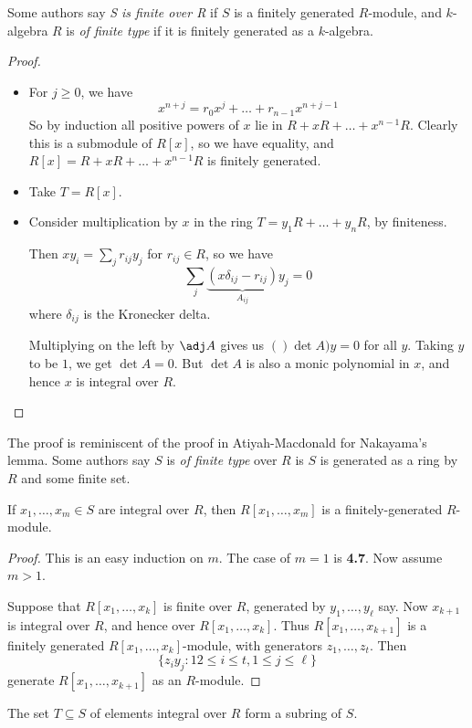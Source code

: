\documentclass[10pt,a4paper]{article}
\begin{document}
Some authors say \emph{S is finite over R} if $S$ is a finitely generated $R$-module, and $k$-algebra $R$ is \emph{of finite type} if it is finitely generated as a $k$-algebra.
\begin{proof}\hspace*{0cm}
  \begin{itemize}
    \item[\imp{1}{2}] For $j\geq 0$, we have
    \[x^{n+j} = r_0x^j + \ldots + r_{n-1}x^{n+j-1}\]
    So by induction all positive powers of $x$ lie in $R+xR+\ldots+x^{n-1}R$. Clearly this is a submodule of $R[x]$, so we have equality, and $R[x]=R+xR+\ldots+x^{n-1}R$ is finitely generated.
    \item[\imp{2}{3}] Take $T = R[x]$.
    \item[\imp{3}{1}] Consider multiplication by $x$ in the ring $T = y_1R + \ldots + y_nR$, by finiteness.

    Then $xy_i = \sum_{j}r_{ij}y_j$ for $r_{ij} \in R$, so we have
    \[\sum_j \underbrace{(x\delta_{ij} - r_{ij})}_{A_{ij}}y_j = 0\]
    where $\delta_{ij}$ is the Kronecker delta.

    Multiplying on the left by $\adj A$ gives us $()\det A)y = 0$ for all $y$. Taking $y$ to be $1$, we get $\det A = 0$. But $\det A$ is also a monic polynomial in $x$, and hence $x$ is integral over $R$.
  \end{itemize}
\end{proof}
The proof is reminiscent of the proof in Atiyah-Macdonald for Nakayama's lemma. Some authors say $S$ is \emph{of finite type} over $R$ is $S$ is generated as a ring by $R$ and some finite set.
\begin{lemma}
  If $x_1, \ldots, x_m \in S$ are integral over $R$, then $R[x_1, \ldots, x_m]$ is a finitely-generated $R$-module.
\end{lemma}
\begin{proof}
  This is an easy induction on $m$. The case of $m=1$ is \textbf{4.7}. Now assume $m >1$.

  Suppose that $R[x_1, \ldots, x_k]$ is finite over $R$, generated by $y_1, \ldots, y_\ell$ say. Now $x_{k+1}$ is integral over $R$, and hence over $R[x_1, \ldots, x_k]$. Thus $R[x_1, \ldots, x_{k+1}]$ is a finitely generated $R[x_1, \ldots, x_k]$-module, with generators $z_1, \ldots, z_t$. Then
  \[\{z_iy_j: 12\leq i\leq t, 1 \leq j \leq \ell\}\]
  generate $R[x_1, \ldots, x_{k+1}]$ as an $R$-module.
\end{proof}
\begin{lemma}
  The set $T\subseteq S$ of elements integral over $R$ form a subring of $S$.
\end{lemma}
\end{document}
